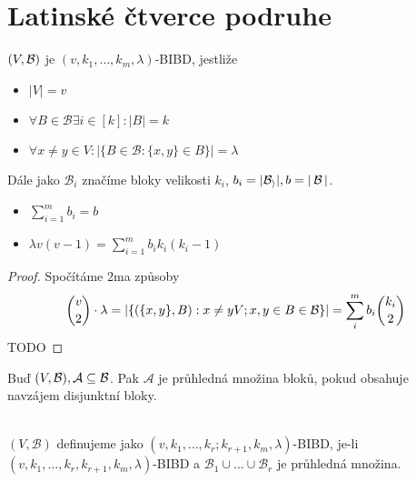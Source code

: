 \section{\texorpdfstring{Latinské čtverce podruhe}{Latinské čtverce podruhe}}

\begin{definition}
    $(V,\operatorname{\mathcal{B}})$ je $(v,k_1,\ldots,k_m,\lambda)$-BIBD, jestliže
    \begin{itemize}
        \item $|V| = v$
        \item $\forall B\in\mathcal{B}\exists i \in[k]: |B|=k$
        \item $\forall x\neq y\in V: |\{B\in\mathcal{B}: \{x,y\}\in B\}|=\lambda$
    \end{itemize}

    Dále jako $\mathcal{B}_i$ značíme bloky velikosti $k_i$, $b_i=|\mathcal{B_i}|, b=|\operatorname{\mathcal{B}}|$.
\end{definition}
\begin{note}
    \begin{itemize}
        \item $\sum_{i=1}^mb_i=b$
        \item $\lambda v(v-1)=\sum_{i=1}^m b_ik_i(k_i-1)$
    \end{itemize}
\end{note}
\begin{proof}
	Spočítáme 2ma způsoby
	\[ \binom{v}{2} \cdot \lambda = |\{ (\{ x, y \}, B): x \ne y V; x, y \in B \in \operatorname{\mathcal{B}} \}| = \sum_i^m b_i \binom{k_i}{2} \]
    TODO
\end{proof}

\begin{definition}
    Buď $(V,\operatorname{\mathcal{B}}), \mathcal{A} \subseteq \operatorname{\mathcal{B}}$.
    Pak $\mathcal{A}$ je průhledná množina bloků, pokud obsahuje navzájem disjunktní bloky.
\end{definition}
\begin{definition}~\\
    $(V,\mathcal{B})$ definujeme jako $(v,k_1,\ldots,k_r;k_{r+1},k_m,\lambda)$-BIBD, je-li $(v,k_1,\ldots,k_r,k_{r+1},k_m,\lambda)$-BIBD a $\mathcal{B}_1\cup\ldots\cup\mathcal{B}_r$ je průhledná množina.
\end{definition}

